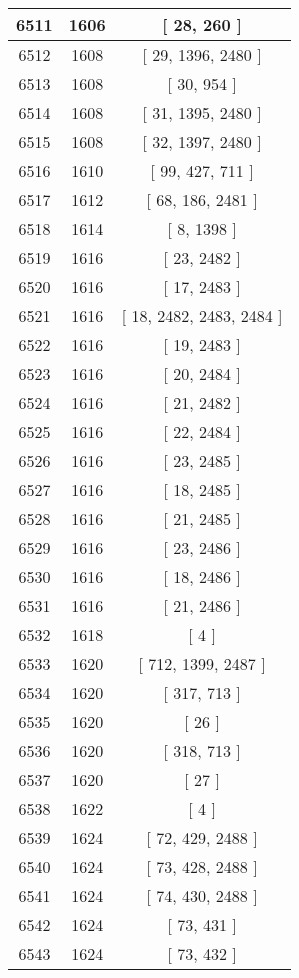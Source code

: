 \begin{center}
\begin{longtable}[H]{|| c c c ||}
\hline
6511 & 1606 & [ 28, 260 ] \\ 
\hline
6512 & 1608 & [ 29, 1396, 2480 ] \\ 
\hline
6513 & 1608 & [ 30, 954 ] \\ 
\hline
6514 & 1608 & [ 31, 1395, 2480 ] \\ 
\hline
6515 & 1608 & [ 32, 1397, 2480 ] \\ 
\hline
6516 & 1610 & [ 99, 427, 711 ] \\ 
\hline
6517 & 1612 & [ 68, 186, 2481 ] \\ 
\hline
6518 & 1614 & [ 8, 1398 ] \\ 
\hline
6519 & 1616 & [ 23, 2482 ] \\ 
\hline
6520 & 1616 & [ 17, 2483 ] \\ 
\hline
6521 & 1616 & [ 18, 2482, 2483, 2484 ] \\ 
\hline
6522 & 1616 & [ 19, 2483 ] \\ 
\hline
6523 & 1616 & [ 20, 2484 ] \\ 
\hline
6524 & 1616 & [ 21, 2482 ] \\ 
\hline
6525 & 1616 & [ 22, 2484 ] \\ 
\hline
6526 & 1616 & [ 23, 2485 ] \\ 
\hline
6527 & 1616 & [ 18, 2485 ] \\ 
\hline
6528 & 1616 & [ 21, 2485 ] \\ 
\hline
6529 & 1616 & [ 23, 2486 ] \\ 
\hline
6530 & 1616 & [ 18, 2486 ] \\ 
\hline
6531 & 1616 & [ 21, 2486 ] \\ 
\hline
6532 & 1618 & [ 4 ] \\ 
\hline
6533 & 1620 & [ 712, 1399, 2487 ] \\ 
\hline
6534 & 1620 & [ 317, 713 ] \\ 
\hline
6535 & 1620 & [ 26 ] \\ 
\hline
6536 & 1620 & [ 318, 713 ] \\ 
\hline
6537 & 1620 & [ 27 ] \\ 
\hline
6538 & 1622 & [ 4 ] \\ 
\hline
6539 & 1624 & [ 72, 429, 2488 ] \\ 
\hline
6540 & 1624 & [ 73, 428, 2488 ] \\ 
\hline
6541 & 1624 & [ 74, 430, 2488 ] \\ 
\hline
6542 & 1624 & [ 73, 431 ] \\ 
\hline
6543 & 1624 & [ 73, 432 ] \\ 

\end{longtable}
\end{center}
